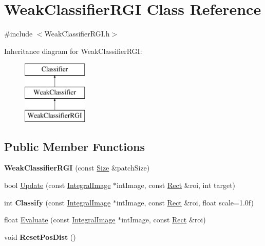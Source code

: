 \hypertarget{classWeakClassifierRGI}{}\section{Weak\+Classifier\+R\+G\+I Class Reference}
\label{classWeakClassifierRGI}


{\ttfamily \#include $<$Weak\+Classifier\+R\+G\+I.\+h$>$}

Inheritance diagram for Weak\+Classifier\+R\+G\+I\+:\begin{figure}[H]
\begin{center}
\leavevmode
\includegraphics[height=3.000000cm]{classWeakClassifierRGI}
\end{center}
\end{figure}
\subsection*{Public Member Functions}
\begin{DoxyCompactItemize}
\item 
\hypertarget{classWeakClassifierRGI_abbd6a27d77c3f38bcf2dce39d7571cf7}{}{\bfseries Weak\+Classifier\+R\+G\+I} (const \hyperlink{classSize}{Size} \&patch\+Size)\label{classWeakClassifierRGI_abbd6a27d77c3f38bcf2dce39d7571cf7}

\item 
bool \hyperlink{classWeakClassifierRGI_ab4719f5dcf7acf6e79beb4d246addaa5}{Update} (const \hyperlink{classIntegralImage}{Integral\+Image} $\ast$int\+Image, const \hyperlink{classRect}{Rect} \&roi, int target)
\item 
\hypertarget{classWeakClassifierRGI_a026ab7a9f1c19ced68746121aacd6374}{}int {\bfseries Classify} (const \hyperlink{classIntegralImage}{Integral\+Image} $\ast$int\+Image, const \hyperlink{classRect}{Rect} \&roi, float scale=1.\+0f)\label{classWeakClassifierRGI_a026ab7a9f1c19ced68746121aacd6374}

\item 
float \hyperlink{classWeakClassifierRGI_aaff18f2962e93ad64eb7b4c6e127b91c}{Evaluate} (const \hyperlink{classIntegralImage}{Integral\+Image} $\ast$int\+Image, const \hyperlink{classRect}{Rect} \&roi)
\item 
\hypertarget{classWeakClassifierRGI_aa48904ae41002320da3e5563aaf1ca60}{}void {\bfseries Reset\+Pos\+Dist} ()\label{classWeakClassifierRGI_aa48904ae41002320da3e5563aaf1ca60}

\end{DoxyCompactItemize}


